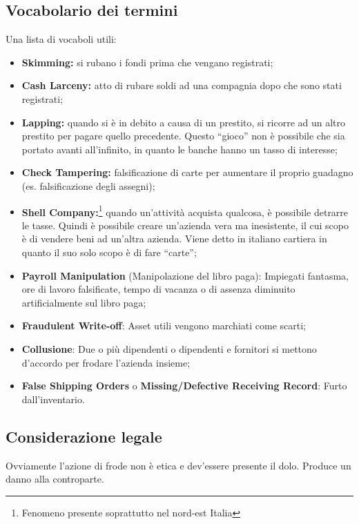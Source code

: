 \subsection{Vocabolario dei termini}

Una lista di vocaboli utili:
\begin{itemize}
  \item \textbf{Skimming:} si rubano i fondi prima che vengano registrati;
  \item \textbf{Cash Larceny:} atto di rubare soldi ad una compagnia 
  dopo che sono stati registrati;
  \item \textbf{Lapping:} quando si è in debito a causa di un prestito,
  si ricorre ad un altro prestito per pagare quello precedente. Questo 
  ``gioco'' non è possibile che sia portato avanti all'infinito, in 
  quanto le banche hanno un tasso di interesse;
  \item \textbf{Check Tampering:} falsificazione di carte per aumentare il proprio 
  guadagno (es. falsificazione degli assegni);
  \item \textbf{Shell Company:}\footnote{Fenomeno presente soprattutto nel nord-est 
  Italia} quando un'attività acquista qualcosa, è possibile detrarre le tasse. Quindi è
  possibile creare un'azienda vera ma inesistente, il cui scopo è di vendere
  beni ad un'altra azienda. Viene detto in italiano cartiera in quanto il suo 
  solo scopo è di fare ``carte'';
  \item \textbf{Payroll Manipulation} (Manipolazione del libro paga):
  Impiegati fantasma, ore di lavoro falsificate, tempo di vacanza
  o di assenza diminuito artificialmente sul libro paga;
  \item \textbf{Fraudulent Write-off}: Asset utili vengono marchiati
  come scarti;
  \item \textbf{Collusione}: Due o più dipendenti o dipendenti e 
  fornitori si mettono d'accordo per frodare l'azienda insieme;
  \item \textbf{False Shipping Orders} o \textbf{Missing/Defective 
  Receiving Record}: Furto dall'inventario.
\end{itemize}

\subsection{Considerazione legale}

Ovviamente l'azione di frode non è etica e dev'essere presente il dolo. Produce 
un danno alla controparte.

